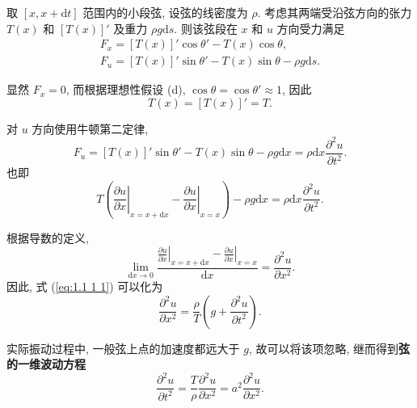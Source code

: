 取 $[x,x+\mathrm{d}t]$ 范围内的小段弦, 设弦的线密度为 $\rho$. 考虑其两端受沿弦方向的张力 $T(x)$ 和 $[T(x)]'$ 及重力 $\rho g\mathrm{d}s$. 则该弦段在 $x$ 和 $u$ 方向受力满足
\begin{gather}
    F_x=[T(x)]'\cos\theta'-T(x)\cos\theta, \\
    F_u=[T(x)]'\sin\theta'-T(x)\sin\theta-\rho g\mathrm{d}s.
\end{gather}

显然 $F_x=0$, 而根据理想性假设 (d), $\cos\theta=\cos\theta'\approx 1$, 因此
\begin{equation}
    T(x)=[T(x)]'=T.
\end{equation}

对 $u$ 方向使用牛顿第二定律,
\begin{equation}
    F_u=[T(x)]'\sin\theta'-T(x)\sin\theta-\rho g\mathrm{d}x=\rho\mathrm{d}x\frac{\partial^2u}{\partial t^2}.
\end{equation}
也即
\begin{equation} \label{eq:1.1 1 1}
    T\left(\left.\frac{\partial u}{\partial x}\right|_{x=x+\mathrm{d}x}-\left.\frac{\partial u}{\partial x}\right|_{x=x}\right)-\rho g\mathrm{d}x=\rho\mathrm{d}x\frac{\partial^2 u}{\partial t^2}.
\end{equation}

根据导数的定义,
\begin{equation}
    \lim_{\mathrm{d}x\rightarrow 0}\frac{\displaystyle \left.\frac{\partial u}{\partial x}\right|_{x=x+\mathrm{d}x}-\left.\frac{\partial u}{\partial x}\right|_{x=x}}{\mathrm{d}x}=\frac{\partial^2 u}{\partial x^2}.
\end{equation}
因此, 式 (\ref{eq:1.1 1 1}) 可以化为
\begin{equation}
    \frac{\partial^2u}{\partial x^2}=\frac{\rho}{T}\left(g+\frac{\partial^2u}{\partial t^2}\right).
\end{equation}

实际振动过程中, 一般弦上点的加速度都远大于 $g$, 故可以将该项忽略, 继而得到\textbf{弦的一维波动方程}
\begin{equation}
    \frac{\partial^2u}{\partial t^2}=\frac{T}{\rho}\frac{\partial^2u}{\partial x^2}=a^2\frac{\partial^2u}{\partial x^2}.
\end{equation}
